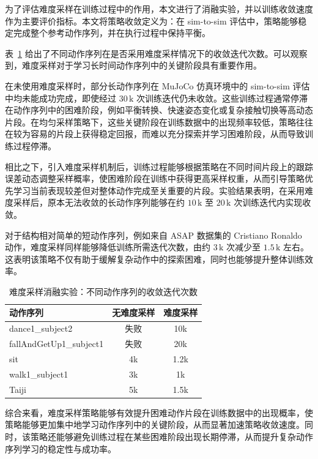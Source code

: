为了评估难度采样在训练过程中的作用，本文进行了消融实验，并以训练收敛速度作为主要评价指标。本文将策略收敛定义为：在 sim-to-sim 评估中，策略能够稳定完成整个参考动作序列，并在执行过程中保持平衡。

表~\ref{tab:adaptive_sampling} 给出了不同动作序列在是否采用难度采样情况下的收敛迭代次数。可以观察到，难度采样对于学习长时间动作序列中的关键阶段具有重要作用。

在未使用难度采样时，部分长动作序列在 MuJoCo 仿真环境中的 sim-to-sim 评估中均未能成功完成，即使经过 $30\,\mathrm{k}$ 次训练迭代仍未收敛。这些训练过程通常停滞在动作序列中的困难阶段，例如平衡转换、快速姿态变化或复杂接触切换等高动态片段。在均匀采样策略下，这些关键阶段在训练数据中的出现频率较低，策略往往在较为容易的片段上获得稳定回报，而难以充分探索并学习困难阶段，从而导致训练过程停滞。

相比之下，引入难度采样机制后，训练过程能够根据策略在不同时间片段上的跟踪误差动态调整采样概率，使困难阶段在训练中获得更高采样权重，从而引导策略优先学习当前表现较差但对整体动作完成至关重要的片段。实验结果表明，在采用难度采样后，原本无法收敛的长动作序列能够在约 $10\,\mathrm{k}$ 至 $20\,\mathrm{k}$ 次训练迭代内实现收敛。

对于结构相对简单的短动作序列，例如来自 ASAP 数据集的 Cristiano Ronaldo 动作，难度采样同样能够降低训练所需迭代次数，由约 $3\,\mathrm{k}$ 次减少至 $1.5\,\mathrm{k}$ 左右。这表明该策略不仅有助于缓解复杂动作中的探索困难，同时也能够提升整体训练效率。

\begin{table}[t]
	\centering
	\caption{难度采样消融实验：不同动作序列的收敛迭代次数}
	\label{tab:adaptive_sampling}
	\begin{tabular}{lcc}
		\toprule
		\textbf{动作序列} & \textbf{无难度采样} & \textbf{难度采样} \\
		\midrule
		dance1\_subject2 & 失败 & 10k \\
		fallAndGetUp1\_subject1 & 失败 & 20k \\
		sit & 4k & 1.2k \\
		walk1\_subject1 & 3k & 1k \\
		Taiji & 5k & 1.5k \\
		\bottomrule
	\end{tabular}
\end{table}

综合来看，难度采样策略能够有效提升困难动作片段在训练数据中的出现概率，使策略能够更加集中地学习动作序列中的关键阶段，从而显著加速策略收敛速度。同时，该策略还能够避免训练过程在某些困难阶段出现长期停滞，从而提升复杂动作序列学习的稳定性与成功率。



